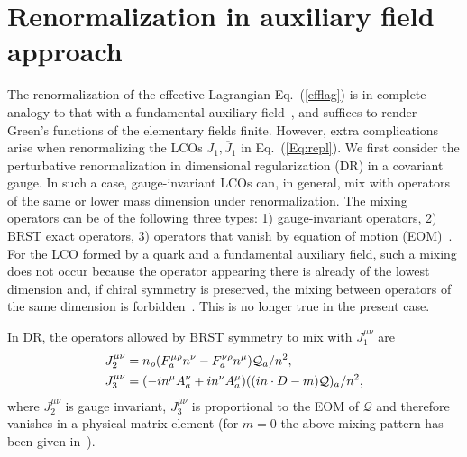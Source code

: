 \section{Renormalization in auxiliary field approach}\label{sec:renorm}

The renormalization of the effective Lagrangian Eq.~(\ref{efflag}) is in complete analogy to that with a fundamental auxiliary field~\cite{Bagan:1993zv,Ji:2017oey}, and suffices to render Green's functions of the elementary fields finite. However, extra complications arise when renormalizing the LCOs $J_1, {\overline J}_1$ in Eq.~(\ref{Eq:repl}).
We first consider the perturbative renormalization in dimensional regularization (DR) in a covariant gauge. In such a case, gauge-invariant LCOs can, in general, mix with operators of the same or lower mass dimension under renormalization. The mixing operators can be of the following three types: 1) gauge-invariant operators, 2) BRST exact operators,
3) operators that vanish by equation of motion (EOM)~\cite{Collins:1984xc}. For the LCO formed by a quark and a fundamental auxiliary field, such a mixing does not occur because the operator appearing there is already of the lowest dimension and, if chiral symmetry is preserved, the mixing between operators of the same dimension is forbidden~\cite{Chen:2017mie}. This is no longer true in the present case.

In DR, the operators allowed by BRST symmetry to mix with $J_1^{\mu\nu}$ are
\begin{align}\label{mixingop}
J_2^{\mu\nu}&=n_{\rho}(F^{\mu\rho}_a n^\nu-F^{\nu\rho}_a n^{\mu}){\mathcal Q}_a/n^2,\nonumber\\
J_3^{\mu\nu}&=(-in^\mu A_a^{\nu}+in^\nu A_a^\mu)((in\cdot D-m) \mathcal Q)_a/n^2,
\end{align}
where $J_2^{\mu\nu}$ is gauge invariant, $J_3^{\mu\nu}$ is proportional to the EOM of $\mathcal Q$ and therefore vanishes in a physical matrix element (for $m=0$ the above mixing pattern has been given in~\cite{Dorn:1981wa}).

